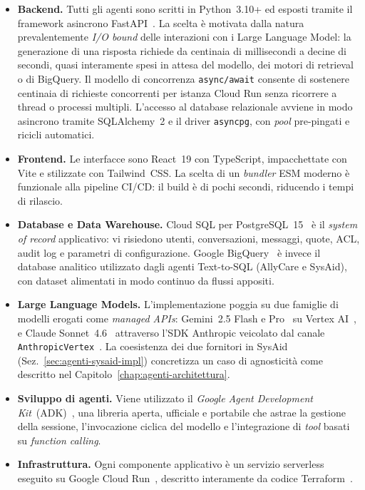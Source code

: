 \begin{itemize}
  \item \textbf{Backend.} Tutti gli agenti sono scritti in Python~3.10+ ed
        esposti tramite il framework asincrono FastAPI~\cite{fastapi_docs}. La scelta è motivata
        dalla natura prevalentemente \emph{I/O bound} delle interazioni con i
        Large Language Model: la generazione di una risposta richiede da
        centinaia di millisecondi a decine di secondi, quasi interamente spesi
        in attesa del modello, dei motori di retrieval o di BigQuery. Il modello
        di concorrenza \texttt{async/await} consente di sostenere centinaia di
        richieste concorrenti per istanza Cloud Run senza ricorrere a
        thread o processi multipli. L'accesso al database relazionale avviene
        in modo asincrono tramite SQLAlchemy~2 e il driver
        \texttt{asyncpg}, con \emph{pool} pre-pingati e ricicli automatici.
  \item \textbf{Frontend.} Le interfacce sono React~19 con TypeScript,
        impacchettate con Vite e stilizzate con Tailwind~CSS. La scelta
        di un \emph{bundler} ESM moderno è funzionale alla pipeline CI/CD:
        il build è di pochi secondi, riducendo i tempi di rilascio.
  \item \textbf{Database e Data Warehouse.} Cloud SQL per
        PostgreSQL~15~\cite{gcp_cloudsql} è il \emph{system of record}
        applicativo: vi risiedono utenti, conversazioni, messaggi, quote,
        ACL, audit log e parametri di configurazione. Google
        BigQuery~\cite{gcp_bigquery} è invece il database analitico
        utilizzato dagli agenti Text-to-SQL (AllyCare e SysAid), con
        dataset alimentati in modo continuo da flussi appositi.
  \item \textbf{Large Language Models.} L'implementazione poggia su due
        famiglie di modelli erogati come \emph{managed APIs}: Gemini~2.5
        Flash e Pro~\cite{team2024gemini} su Vertex AI~\cite{gcp_vertexai},
        e Claude Sonnet~4.6~\cite{anthropic2024claude}
        attraverso l'SDK Anthropic veicolato dal canale
        \texttt{AnthropicVertex}~\cite{anthropic_docs}. La coesistenza
        dei due fornitori in SysAid (Sez.~\ref{sec:agenti-sysaid-impl})
        concretizza un caso di agnosticità come descritto nel
        Capitolo~\ref{chap:agenti-architettura}.
  \item \textbf{Sviluppo di agenti.} Viene utilizzato il \emph{Google Agent
        Development Kit}~(ADK)~\cite{google_adk_docs}, una libreria aperta,
        ufficiale e portabile che astrae la gestione della sessione, l'invocazione
        ciclica del modello e l'integrazione di \emph{tool} basati su
        \emph{function calling}. 
 \item \textbf{Infrastruttura.} Ogni componente applicativo è un servizio
        serverless eseguito su Google Cloud Run~\cite{gcp_cloudrun},
        descritto interamente da codice Terraform~\cite{terraform_docs}.
\end{itemize}

